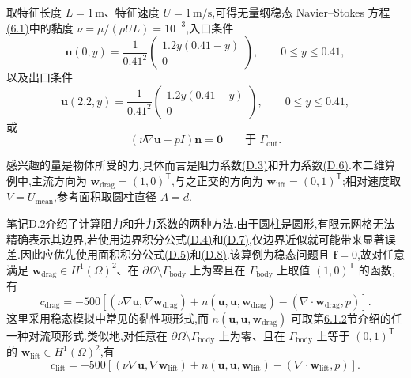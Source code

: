 \begin{example}[二维中 $\mathrm{Re}=20$ 的定常圆柱绕流]
取特征长度 $L=1\,\mathrm m$、特征速度 $U=1\,\mathrm{m/s}$,可得无量纲稳态 Navier--Stokes 方程\hyperref[eq:steady-ns-strong]{(6.1)}中的黏度 $\nu=\mu/(\rho UL)=10^{-3}$,入口条件
\[
\bm u(0,y)=\frac{1}{0.41^2}
\begin{pmatrix}1.2y(0.41-y)\\0\end{pmatrix},
\qquad 0\le y\le0.41,
\]
以及出口条件
\begin{equation}\label{eq:appendix-d-14}
\bm u(2.2,y)=\frac{1}{0.41^2}
\begin{pmatrix}1.2y(0.41-y)\\0\end{pmatrix},
\qquad 0\le y\le0.41,
\end{equation}
或
\begin{equation}\label{eq:appendix-d-15}
(\nu\nabla\bm u-pI)\bm n=\bm0
\qquad\text{于 }\Gamma_{\mathrm{out}}.
\end{equation}

感兴趣的量是物体所受的力,具体而言是阻力系数\hyperref[eq:appendix-d-3]{(D.3)}和升力系数\hyperref[eq:appendix-d-6]{(D.6)}.本二维算例中,主流方向为 $\bm w_{\mathrm{drag}}=(1,0)^\mathsf T$,与之正交的方向为 $\bm w_{\mathrm{lift}}=(0,1)^\mathsf T$;相对速度取 $V=U_{\mathrm{mean}}$,参考面积取圆柱直径 $A=d$.

笔记\hyperref[note:appendix-d-2]{D.2}介绍了计算阻力和升力系数的两种方法.由于圆柱是圆形,有限元网格无法精确表示其边界,若使用边界积分公式\hyperref[eq:appendix-d-4]{(D.4)}和\hyperref[eq:appendix-d-7]{(D.7)},仅边界近似就可能带来显著误差.因此应优先使用面积积分公式\hyperref[eq:appendix-d-5]{(D.5)}和\hyperref[eq:appendix-d-8]{(D.8)}.该算例为稳态问题且 $\bm f=0$,故对任意满足
$\bm w_{\mathrm{drag}}\in H^1(\Omega)^2$、在 $\partial\Omega\setminus\Gamma_{\mathrm{body}}$ 上为零且在 $\Gamma_{\mathrm{body}}$ 上取值 $(1,0)^\mathsf T$ 的函数,有
\begin{equation}\label{eq:appendix-d-16}
c_{\mathrm{drag}}
=-500\left[
(\nu\nabla\bm u,\nabla\bm w_{\mathrm{drag}})
+n(\bm u,\bm u,\bm w_{\mathrm{drag}})
-(\nabla\cdot\bm w_{\mathrm{drag}},p)
\right].
\end{equation}
这里采用稳态模拟中常见的黏性项形式,而 $n(\bm u,\bm u,\bm w_{\mathrm{drag}})$ 可取第\hyperref[subsec:steady-ns-nonlinear-term]{6.1.2}节介绍的任一种对流项形式.类似地,对任意在 $\partial\Omega\setminus\Gamma_{\mathrm{body}}$ 上为零、且在 $\Gamma_{\mathrm{body}}$ 上等于 $(0,1)^\mathsf T$ 的 $\bm w_{\mathrm{lift}}\in H^1(\Omega)^2$,有
\begin{equation}\label{eq:appendix-d-17}
c_{\mathrm{lift}}
=-500\left[
(\nu\nabla\bm u,\nabla\bm w_{\mathrm{lift}})
+n(\bm u,\bm u,\bm w_{\mathrm{lift}})
-(\nabla\cdot\bm w_{\mathrm{lift}},p)
\right].
\end{equation}


\end{example}
